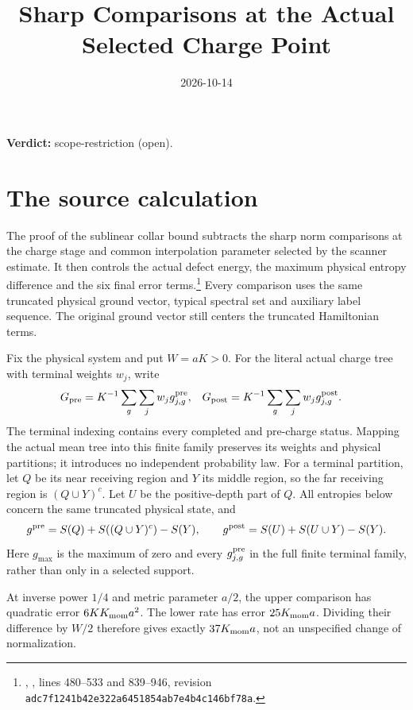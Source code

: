 \documentclass{article}
\title{Sharp Comparisons at the Actual Selected Charge Point}
\author{}
\date{2026-10-14}
\providecommand{\gapnote}[2]{\par\noindent\textbf{Verdict:} #1 (#2).\par}
\begin{document}
\maketitle
\gapnote{scope-restriction}{open}

\section{The source calculation}

The proof of the sublinear collar bound subtracts the sharp norm comparisons
at the charge stage and common interpolation parameter selected by the
scanner estimate. It then controls the actual defect energy, the maximum
physical entropy difference and the six final error terms.\footnote{
  \cite{OpenAI2026AreaLaw}, , lines 480--533 and 839--946,
  revision \texttt{adc7f1241b42e322a6451854ab7e4b4c146bf78a}.}
Every comparison uses the same truncated physical ground vector, typical
spectral set and auxiliary label sequence. The original ground vector still
centers the truncated Hamiltonian terms.

Fix the physical system and put $W=aK>0$. For the literal actual charge
tree with terminal weights $w_j$, write
\begin{align}
 G_{\rm pre}&=K^{-1}\sum_g\sum_jw_j g^{\rm pre}_{j,g},&
 G_{\rm post}&=K^{-1}\sum_g\sum_jw_j g^{\rm post}_{j,g}.
 \label{eq:selected_sharp_averages}
\end{align}
The terminal indexing contains every completed and pre-charge status.
Mapping the actual mean tree into this finite family preserves its weights
and physical partitions; it introduces no independent probability law.
For a terminal partition, let $Q$ be its near receiving region and $Y$ its
middle region, so the far receiving region is $(Q\cup Y)^c$. Let $U$ be
the positive-depth part of $Q$. All entropies below concern the same
truncated physical state, and
\[
 g^{\rm pre}=S(Q)+S((Q\cup Y)^c)-S(Y),\qquad
 g^{\rm post}=S(U)+S(U\cup Y)-S(Y).
\]
Here $g_{\max}$ is the maximum of zero and every $g^{\rm pre}_{j,g}$ in
the full finite terminal family, rather than only in a selected support.

At inverse power $1/4$ and metric parameter $a/2$, the upper comparison has
quadratic error $6K K_{\rm mom}a^2$. The lower rate has error
$25K_{\rm mom}a$. Dividing their difference by $W/2$ therefore gives exactly
$37K_{\rm mom}a$, not an unspecified change of normalization.
\end{document}
